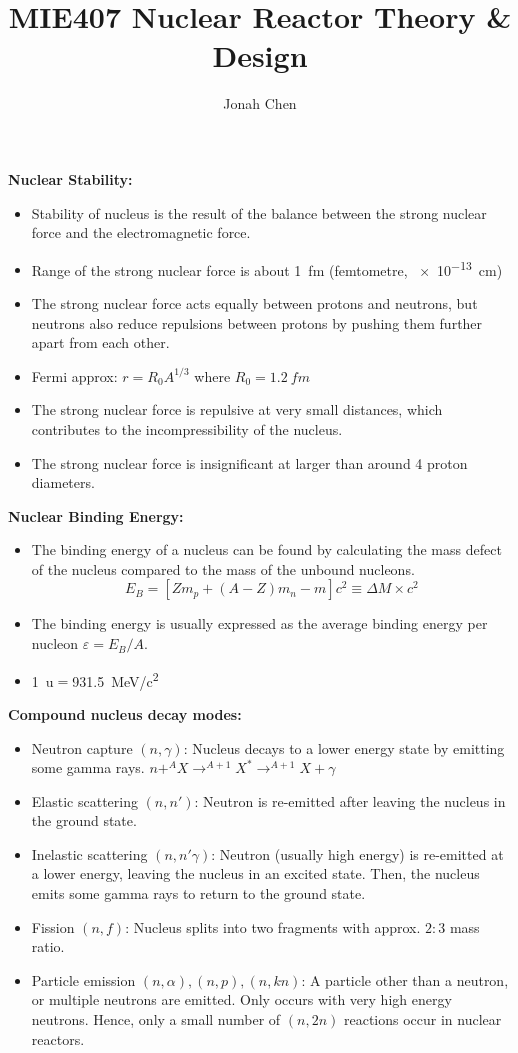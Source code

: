 \documentclass[a4paper]{article}
\title{MIE407 Nuclear Reactor Theory \& Design}
\author{Jonah Chen}
\date{}
\begin{document}
\maketitle 
\sffamily
\textbf{Nuclear Stability:}
\begin{itemize}
    \item Stability of nucleus is the result of the balance between the strong nuclear force and the electromagnetic force.
    \item Range of the strong nuclear force is about \SI{1}{fm} (femtometre, \SI{e-13}{cm})
    \item The strong nuclear force acts equally between protons and neutrons, but neutrons also reduce repulsions between protons by pushing them further apart from each other.
    \item Fermi approx: $r = R_0 A^{1/3}$ where $R_0 = \SI{1.2}{fm}$
    \item The strong nuclear force is repulsive at very small distances, which contributes to the incompressibility of the nucleus.
    \item The strong nuclear force is insignificant at larger than around 4 proton diameters.
\end{itemize}
\textbf{Nuclear Binding Energy:}
\begin{itemize}
    \item The binding energy of a nucleus can be found by calculating the mass defect of the nucleus compared to the mass of the unbound nucleons.
    \begin{equation}
        E_B=[Zm_p + (A-Z)m_n - m] c^2\equiv \Delta M\times c^2
    \end{equation}
    \item The binding energy is usually expressed as the average binding energy per nucleon $\varepsilon = E_B/A$.
    \item \SI{1}{u}$=$\SI{931.5}{MeV/c^2}
\end{itemize}
\textbf{Compound nucleus decay modes:}
\begin{itemize}
    \item Neutron capture $(n,\gamma)$: Nucleus decays to a lower energy state by emitting some gamma rays. $n+ ^AX\to ^{A+1}X^*\to ^{A+1}X+\gamma$
    \item Elastic scattering $(n,n')$: Neutron is re-emitted after leaving the nucleus in the ground state.
    \item Inelastic scattering $(n,n'\gamma)$: Neutron (usually high energy) is re-emitted at a lower energy, leaving the nucleus in an excited state. Then, the nucleus emits some gamma rays to return to the ground state.
    \item Fission $(n,f)$: Nucleus splits into two fragments with approx. $2:3$ mass ratio.
    \item Particle emission $(n,\alpha),(n,p),(n,kn)$: A particle other than a neutron, or multiple neutrons are emitted. Only occurs with very high energy neutrons. Hence, only a small number of $(n,2n)$ reactions occur in nuclear reactors.
\end{itemize}
\end{document}
